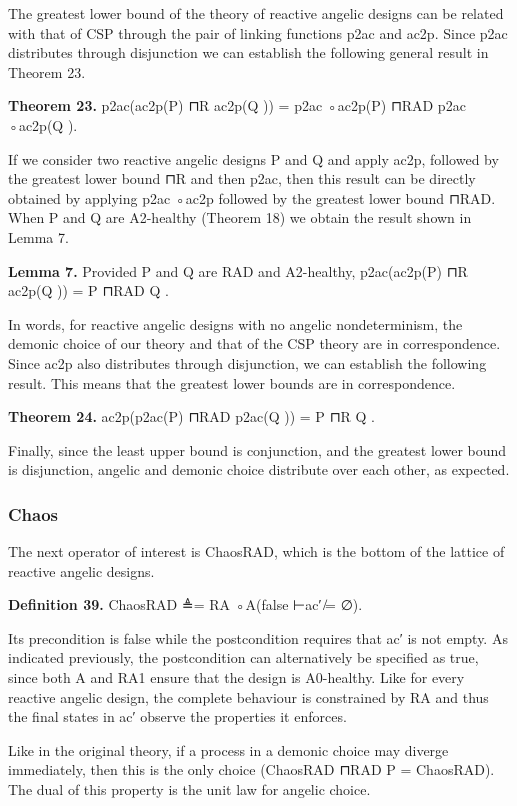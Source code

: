 \documentclass[11pt]{article}
\begin{document}
The greatest lower bound of the theory of reactive angelic designs can be related with that of CSP through the pair of linking functions p2ac and ac2p. Since p2ac distributes through disjunction we can establish the following general result in Theorem 23.

\noindent\textbf{Theorem 23.} p2ac(ac2p(P) ⊓R ac2p(Q )) = p2ac ◦ac2p(P) ⊓RAD p2ac ◦ac2p(Q ).


If we consider two reactive angelic designs P and Q and apply ac2p, followed by the greatest lower bound ⊓R and then p2ac, then this result can be directly obtained by applying p2ac ◦ac2p followed by the greatest lower bound ⊓RAD. When P and Q are A2-healthy (Theorem 18) we obtain the result shown in Lemma 7.

\noindent\textbf{Lemma 7.} Provided P and Q are RAD and A2-healthy, p2ac(ac2p(P) ⊓R ac2p(Q )) = P ⊓RAD Q .


In words, for reactive angelic designs with no angelic nondeterminism, the demonic choice of our theory and that of the CSP theory are in correspondence. Since ac2p also distributes through disjunction, we can establish the following result. This means that the greatest lower bounds are in correspondence.

\noindent\textbf{Theorem 24.} ac2p(p2ac(P) ⊓RAD p2ac(Q )) = P ⊓R Q .


Finally, since the least upper bound is conjunction, and the greatest lower bound is disjunction, angelic and demonic choice distribute over each other, as expected.

\subsubsection{Chaos}
The next operator of interest is ChaosRAD, which is the bottom of the lattice of reactive angelic designs.

\noindent\textbf{Definition 39.} ChaosRAD ≜= RA ◦A(false ⊢ac′ ̸= ∅).


Its precondition is false while the postcondition requires that ac′ is not empty. As indicated previously, the postcondition can alternatively be specified as true, since both A and RA1 ensure that the design is A0-healthy. Like for every reactive angelic design, the complete behaviour is constrained by RA and thus the final states in ac′ observe the properties it enforces.

Like in the original theory, if a process in a demonic choice may diverge immediately, then this is the only choice (ChaosRAD ⊓RAD P = ChaosRAD). The dual of this property is the unit law for angelic choice.
\end{document}
